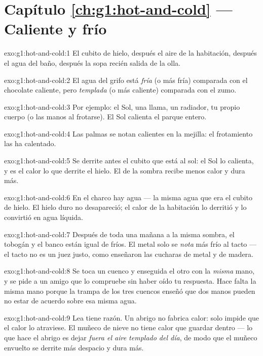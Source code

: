 \section*{Capítulo \ref{ch:g1:hot-and-cold} --- Caliente y frío}

\begin{solution}{exo:g1:hot-and-cold:1}
El cubito de hielo, después el aire de la habitación, después el agua
del baño, después la sopa recién salida de la olla.
\end{solution}

\begin{solution}{exo:g1:hot-and-cold:2}
El agua del grifo está \emph{fría} (o más fría) comparada con el
chocolate caliente, pero \emph{templada} (o más caliente) comparada
con el zumo.
\end{solution}

\begin{solution}{exo:g1:hot-and-cold:3}
Por ejemplo: el Sol, una llama, un radiador, tu propio cuerpo (o las
manos al frotarse). El Sol calienta el parque entero.
\end{solution}

\begin{solution}{exo:g1:hot-and-cold:4}
Las palmas se notan calientes en la mejilla: el frotamiento las ha
calentado.
\end{solution}

\begin{solution}{exo:g1:hot-and-cold:5}
Se derrite antes el cubito que está al sol: el Sol lo calienta, y es
el calor lo que derrite el hielo. El de la sombra recibe menos calor y
dura más.
\end{solution}

\begin{solution}{exo:g1:hot-and-cold:6}
En el charco hay agua --- la misma agua que era el cubito de hielo. El
hielo duro no desapareció; el calor de la habitación lo derritió y lo
convirtió en agua líquida.
\end{solution}

\begin{solution}{exo:g1:hot-and-cold:7}
Después de toda una mañana a la misma sombra, el tobogán y el banco
están igual de fríos. El metal solo se \emph{nota} más frío al tacto
--- el tacto no es un juez justo, como enseñaron las cucharas de metal
y de madera.
\end{solution}

\begin{solution}{exo:g1:hot-and-cold:8}
Se toca un cuenco y enseguida el otro con la \emph{misma} mano, y se
pide a un amigo que lo compruebe sin haber oído tu respuesta. Hace
falta la misma mano porque la trampa de los tres cuencos enseñó que
dos manos pueden no estar de acuerdo sobre esa misma agua.
\end{solution}

\begin{solution}{exo:g1:hot-and-cold:9}
Lea tiene razón. Un abrigo no fabrica calor: solo impide que el calor
lo atraviese. El muñeco de nieve no tiene calor que guardar dentro
--- lo que hace el abrigo es dejar \emph{fuera el aire templado del
día}, de modo que el muñeco envuelto se derrite más despacio y dura
más.
\end{solution}
